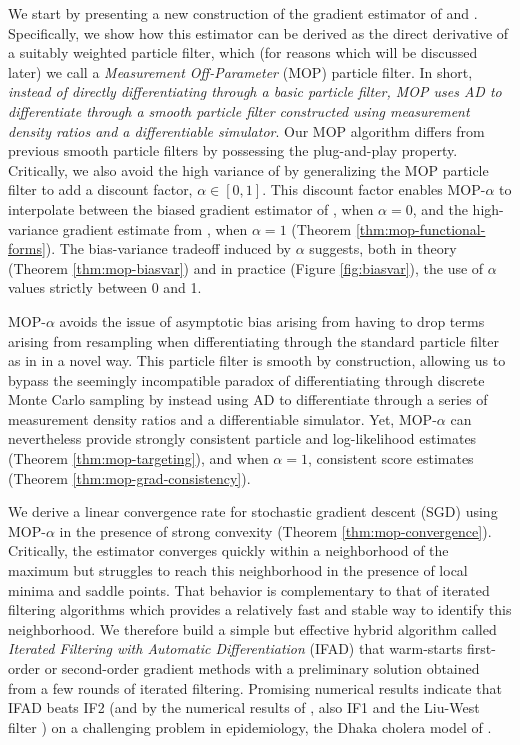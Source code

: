 \documentclass[9pt,twocolumn,pnasresearcharticle]{pnas-new}
\begin{document}
We start by presenting a new construction of the gradient estimator of \cite{scibior21} and \cite{poyiadjis11}.
Specifically, we show how this estimator can be derived as the direct derivative of a suitably weighted particle filter, which (for reasons which will be discussed later) we call a {\it Measurement Off-Parameter} (MOP) particle filter. 
In short, \textit{instead of directly differentiating through a basic particle filter, MOP uses AD to differentiate through a smooth particle filter constructed using measurement density ratios and a differentiable simulator}. 
Our MOP algorithm differs from previous smooth particle filters \cite{svensson18,malik11} by possessing the plug-and-play property.
Critically, we also avoid the high variance of \cite{svensson18} by generalizing the MOP particle filter to add a discount factor, $\alpha \in [0,1]$.
This discount factor enables MOP-$\alpha$ to interpolate between the  biased gradient estimator of \cite{naesseth18}, when $\alpha=0$, and the high-variance gradient estimate from \cite{poyiadjis11, scibior21}, when $\alpha=1$ (Theorem \ref{thm:mop-functional-forms}).
The bias-variance tradeoff induced by $\alpha$ suggests, both in theory (Theorem \ref{thm:mop-biasvar}) and in practice (Figure \ref{fig:biasvar}), the use of $\alpha$ values strictly between 0 and 1.

MOP-$\alpha$ avoids the issue of asymptotic bias \cite{corenflos21} arising from having to drop terms arising from resampling when differentiating through the standard particle filter as in \cite{naesseth18} in a novel way.
This particle filter is smooth by construction, allowing us to bypass the seemingly incompatible paradox of differentiating through discrete Monte Carlo sampling by instead using AD to differentiate through a series of measurement density ratios and a differentiable simulator.
Yet, MOP-$\alpha$ can nevertheless provide strongly consistent particle and log-likelihood estimates (Theorem \ref{thm:mop-targeting}), and when $\alpha=1$, consistent score estimates (Theorem \ref{thm:mop-grad-consistency}).

We derive a linear convergence rate for stochastic gradient descent (SGD) using MOP-$\alpha$ in the  presence of strong convexity (Theorem \ref{thm:mop-convergence}).
Critically, the estimator converges quickly within a neighborhood of the maximum but struggles to reach this neighborhood in the presence of local minima and saddle points.
That behavior is complementary to that of iterated filtering algorithms \cite{ionides06-pnas,ionides15} which provides a relatively fast and stable way to identify this neighborhood.
We therefore build a simple but effective hybrid algorithm called {\it Iterated Filtering with Automatic Differentiation} (IFAD) that warm-starts first-order or second-order gradient methods with a preliminary solution obtained from a few rounds of iterated filtering.
Promising numerical results indicate that IFAD beats IF2 (and by the numerical results of \cite{ionides15}, also IF1 \cite{ionides06-pnas,ionides11} and the Liu-West filter \cite{liuwest01}) on a challenging problem in epidemiology, the Dhaka cholera model of \cite{king08}.
\end{document}
